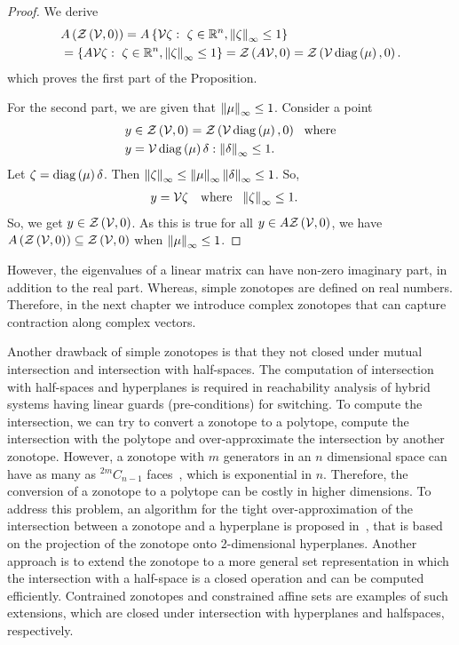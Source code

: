 \begin{proof}
We derive
\begin{align*}
& A\left(\mathit{\mathcal{Z}}\left(\mathcal{V},0\right)\right) =
A\left\{\mathcal{V}\zeta:~\zeta\in\mathbb{R}^n,\left\|\zeta\right\|_{\infty}\leq 1\right\}\\
& =\left\{A\mathcal{V}\zeta:~\zeta\in\mathbb{R}^n,\left\|\zeta\right\|_{\infty}\leq 1\right\}
= \mathit{\mathcal{Z}}\left(A\mathcal{V},0\right)=\mathit{\mathcal{Z}}\left(\mathcal{V}\operatorname{diag}\left(\mu\right),0\right).
\end{align*}
%
which proves the first part of the
Proposition.

For the second part, we are given that $\left\|\mu\right\|_{\infty}\leq 1$.
Consider a point
%
\begin{align*}
  & y\in \mathit{\mathcal{Z}}\left(\mathcal{V},0\right)=\mathit{\mathcal{Z}}\left(\mathcal{V}\operatorname{diag}\left(\mu\right),0\right)~~\text{where}\\
  &y = \mathcal{V}\operatorname{diag}\left(\mu\right)\delta:\left\|\delta\right\|_{\infty}\leq
1.
\end{align*}
%
Let $\zeta = \operatorname{diag}\left(\mu\right)\delta$. Then $\left\|\zeta\right\|_{\infty} \leq
\left\|\mu\right\|_{\infty}\left\|\delta\right\|_{\infty} \leq 1$.  So,
%
\begin{align*}
  & y=\mathcal{V}\zeta~~\text{ where }~
  \left\|\zeta\right\|_{\infty}\leq 1.
\end{align*}
%
So, we get $y\in \mathit{\mathcal{Z}}\left(\mathcal{V},0\right)$.  As this is true for all $y\in
A\mathit{\mathcal{Z}}\left(\mathcal{V},0\right)$, we have
$A\left(\mathit{\mathcal{Z}}\left(\mathcal{V},0\right)\right)\subseteq
\mathit{\mathcal{Z}}\left(\mathcal{V},0\right)$ when $\left\|\mu\right\|_{\infty}\leq 1$.
\end{proof}
%
However, the eigenvalues of a linear matrix can have non-zero
imaginary part, in addition to the real part.  Whereas, simple
zonotopes are defined on real numbers.  Therefore, in the next chapter
we introduce complex zonotopes that can capture contraction along
complex vectors.

Another drawback of simple zonotopes is that they not closed under
mutual intersection and intersection with half-spaces.  The
computation of intersection with half-spaces and hyperplanes is
required in reachability analysis of hybrid systems having linear
guards (pre-conditions) for switching.  To compute the intersection,
we can try to convert a zonotope to a polytope, compute the
intersection with the polytope and over-approximate the intersection
by another zonotope.  However, a zonotope with $m$ generators in an
$n$ dimensional space can have as many as $^{2m}C_{n-1}$
faces~\cite{todo}, which is exponential in $n$.  Therefore, the
conversion of a zonotope to a polytope can be costly in higher
dimensions.  To address this problem, an algorithm for the tight
over-approximation of the intersection between a zonotope and a
hyperplane is proposed in~\cite{todo}, that is based on the projection
of the zonotope onto 2-dimensional hyperplanes.  Another approach is
to extend the zonotope to a more general set representation in which
the intersection with a half-space is a closed operation and can be
computed efficiently.  Contrained zonotopes and constrained affine
sets are examples of such extensions, which are closed under
intersection with hyperplanes and halfspaces, respectively.


